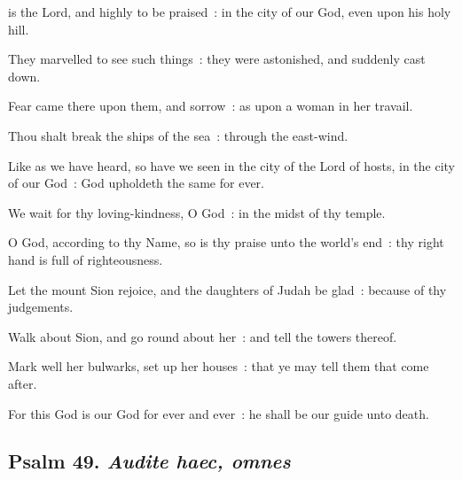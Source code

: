  is the Lord, and highly to be praised~: in the city of our God, even upon his holy hill.\par
{}
They marvelled to see such things~: they were astonished, and suddenly cast down.\par
{}Fear came there upon them, and sorrow~: as upon a woman in her travail.\par
{}Thou shalt break the ships of the sea~: through the east-wind.\par
{}Like as we have heard, so have we seen in the city of the Lord of hosts, in the city of our God~: God upholdeth the same for ever.\par
{}We wait for thy loving-kindness, O God~: in the midst of thy temple.\par
{}O God, according to thy Name, so is thy praise unto the world's end~: thy right hand is full of righteousness.\par
{}Let the mount Sion rejoice, and the daughters of Judah be glad~: because of thy judgements.\par
{}Walk about Sion, and go round about her~: and tell the towers thereof.\par
{}Mark well her bulwarks, set up her houses~: that ye may tell them that come after.\par
{}For this God is our God for ever and ever~: he shall be our guide unto death.\par

\subsection{Psalm 49. \textit{Audite haec, omnes}}


